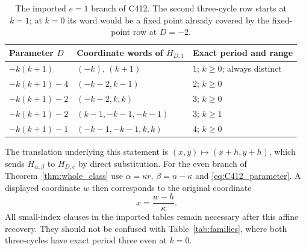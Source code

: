 \begin{table}[htbp]
\centering
\small
\begin{tabular}{@{}L{.23\textwidth}L{.37\textwidth}L{.30\textwidth}@{}}
\toprule
Parameter $D$ & Coordinate words of $H_{D,1}$ & Exact period and range \\
\midrule
$-k(k+1)$ & $(-k)$, $(k+1)$ & $1$; $k\ge0$; always distinct \\
$-k(k+1)-4$ & $(-k-2,k-1)$ & $2$; $k\ge0$ \\
$-k(k+1)-2$ & $(-k-2,k,k)$ & $3$; $k\ge0$ \\
$-k(k+1)-2$ & $(k-1,-k-1,-k-1)$ & $3$; $k\ge1$ \\
$-k(k+1)-1$ & $(-k-1,-k-1,k,k)$ & $4$; $k\ge0$ \\
\bottomrule
\end{tabular}
\caption{The imported $e=1$ branch of C412. The second
three-cycle row starts at $k=1$; at $k=0$ its word would be a
fixed point already covered by the fixed-point row at $D=-2$.}
\label{tab:C412_odd}
\end{table}

The translation underlying this statement is
$(x,y)\mapsto(x+h,y+h)$, which sends
$H_{\alpha,\beta}$ to $H_{D,e}$ by direct substitution.
For the even branch of Theorem~\ref{thm:whole_class} use
$\alpha=\kappa r$, $\beta=n-\kappa$ and
\eqref{eq:C412_parameter}. A displayed coordinate $w$ then
corresponds to the original coordinate
\begin{equation}
 x=\frac{w-h}{\kappa}.
 \label{eq:even_recovery}
\end{equation}
All small-index clauses in the imported tables remain necessary
after this affine recovery. They should not be confused with
Table~\ref{tab:families}, where both three-cycles have exact
period three even at $k=0$.
